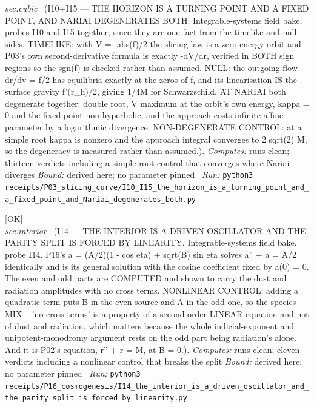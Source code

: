 \begin{description}
\textit{sec:cubic} \ (I10+I15 --- THE HORIZON IS A TURNING POINT AND A FIXED POINT, AND NARIAI DEGENERATES BOTH. Integrable-systems field bake, probes I10 and I15 together, since they are one fact from the timelike and null sides. TIMELIKE: with V = -abs(f)/2 the slicing law is a zero-energy orbit and P03's own second-derivative formula is exactly -dV/dr, verified in BOTH sign regions so the sgn(f) is checked rather than assumed. NULL: the outgoing flow dr/dv = f/2 has equilibria exactly at the zeros of f, and its linearisation IS the surface gravity f'(r\_h)/2, giving 1/4M for Schwarzschild. AT NARIAI both degenerate together: double root, V maximum at the orbit's own energy, kappa = 0 and the fixed point non-hyperbolic, and the approach costs infinite affine parameter by a logarithmic divergence. NON-DEGENERATE CONTROL: at a simple root kappa is nonzero and the approach integral converges to 2 sqrt(2) M, so the degeneracy is measured rather than assumed.). 
\emph{Computes:} runs clean; thirteen verdicts including a simple-root control that converges where Nariai diverges
 \emph{Bound:} derived here; no parameter pinned
\ \emph{Run:} \texttt{python3 receipts/P03\_slicing\_curve/I10\_I15\_the\_horizon\_is\_a\_turning\_point\_and\_a\_fixed\_point\_and\_Nariai\_degenerates\_both.py}
\item[\label{rcpt:I14_the_interior_is_a_driven_oscillator_and_the_parity_split_is_forced_by_linearity}\texttt{I14\_the\_interior\_is\_a\_driven\_oscillator\_and\_the\_parity\_split\_is\_forced\_by\_linearity}]\hfill\textsf{[OK]}\\
\textit{sec:interior} \ (I14 --- THE INTERIOR IS A DRIVEN OSCILLATOR AND THE PARITY SPLIT IS FORCED BY LINEARITY. Integrable-systems field bake, probe I14. P16's a = (A/2)(1 - cos eta) + sqrt(B) sin eta solves a'' + a = A/2 identically and is its general solution with the cosine coefficient fixed by a(0) = 0. The even and odd parts are COMPUTED and shown to carry the dust and radiation amplitudes with no cross terms. NONLINEAR CONTROL: adding a quadratic term puts B in the even source and A in the odd one, so the species MIX -- 'no cross terms' is a property of a second-order LINEAR equation and not of dust and radiation, which matters because the whole indicial-exponent and unipotent-monodromy argument rests on the odd part being radiation's alone. And it is P02's equation, r'' + r = M, at B = 0.). 
\emph{Computes:} runs clean; eleven verdicts including a nonlinear control that breaks the split
 \emph{Bound:} derived here; no parameter pinned
\ \emph{Run:} \texttt{python3 receipts/P16\_cosmogenesis/I14\_the\_interior\_is\_a\_driven\_oscillator\_and\_the\_parity\_split\_is\_forced\_by\_linearity.py}

\end{description}
